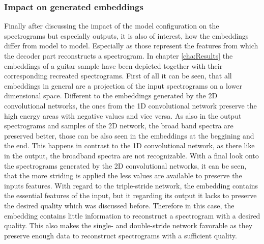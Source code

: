 \subsubsection{Impact on generated embeddings}
Finally after discussing the impact of the model configuration on the spectrograms but especially outputs, it is also of interest, how the embeddings differ from model to model. Especially as those represent the features from which the decoder part reconstructs a spectrogram. In chapter \ref{cha:Results} the embeddings of a guitar sample have been depicted together with their corresponding recreated spectrograms. First of all it can be seen, that all embeddings in general are a projection of the input spectrograms on a lower dimensional space. Different to the embeddings generated by the 2D convolutional networks, the ones from the 1D convolutional network preserve the high energy areas with negative values and vice versa. As also in the output spectrograms and samples of the 2D network, the broad band spectra are preserved better, those can be also seen in the embeddings at the beggining and the end. This happens in contrast to the 1D convolutional network, as there like in the output, the broadband spectra are not recognizable. With a final look onto the spectrograms generated by the 2D convolutional networks, it can be seen, that the more striding is applied the less values are available to preserve the inputs features. With regard to the triple-stride network, the embedding contains the essential features of the input, but it regarding its output it lacks to preserve the desired quality which was discussed before. Therefore in this case, the embedding contains little information to reconstruct a spectrogram with a desired quality. This also makes the single- and double-stride network favorable as they preserve enough data to reconstruct spectrograms with a sufficient quality.


